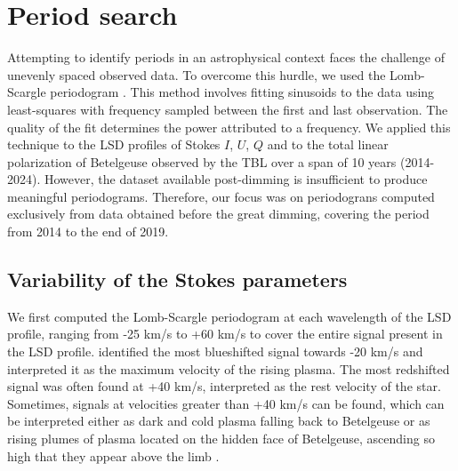\documentclass{aa}
\begin{document}

\section{Period search}
\label{section 3}


Attempting to identify periods in an astrophysical context faces the challenge of unevenly spaced observed data. To overcome this hurdle, 
we used the Lomb-Scargle periodogram \citep{lomb_least-squares_1976,scargle_studies_1982}. This method involves fitting sinusoids to the data using least-squares with frequency sampled between the first and last observation. The quality of the fit determines the power attributed to a frequency. We applied this technique to the  LSD profiles of Stokes $I$, $U$, $Q$ and to the total linear polarization of Betelgeuse observed by the TBL over a span of 10 years (2014-2024). However, the dataset available post-dimming is insufficient to produce meaningful periodograms. Therefore, our focus was on periodograns computed exclusively from data obtained before the great dimming, covering the period from 2014 to the end of 2019. 

\subsection{Variability of the Stokes parameters}

We first computed the Lomb-Scargle periodogram at each wavelength of the LSD profile, ranging from -25 km/s to +60 km/s to cover the entire 
signal present in the LSD profile. \cite{lopez_ariste_convective_2018} identified the most blueshifted signal towards -20 km/s and interpreted it as  the maximum velocity of the rising plasma. The most redshifted signal was often found at +40 km/s, interpreted 
as the rest velocity of the star. Sometimes, signals at velocities greater than +40 km/s can be found, which can be interpreted either as dark and cold plasma falling back to Betelgeuse or as rising plumes of plasma located on the hidden face of Betelgeuse, ascending so high that they appear above the limb \citep[for the case of the RSG $\mu$Cep]{lopez_ariste_height_2023}.





\end{document}
